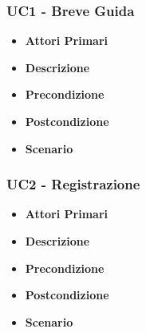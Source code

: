 \subsubsection{UC1 - Breve Guida}
\begin{itemize}
	\item \textbf{Attori Primari}
	\item \textbf{Descrizione}
	\item \textbf{Precondizione}
	\item \textbf{Postcondizione}
	\item \textbf{Scenario}
\end{itemize}
\subsubsection{UC2 - Registrazione}
\begin{itemize}
	\item \textbf{Attori Primari}
	\item \textbf{Descrizione}
	\item \textbf{Precondizione}
	\item \textbf{Postcondizione}
	\item \textbf{Scenario}
\end{itemize}
